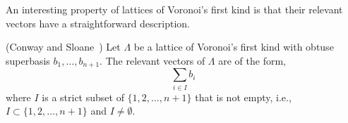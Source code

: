 \documentclass[final,leqno]{siamltex}
\begin{document}
An interesting property of lattices of Voronoi's first kind is that their relevant vectors have a straightforward description.

\begin{theorem} \label{thm:revvecssuperbase} (Conway and Sloane~\cite[Theorem~3]{ConwaySloane1992_voronoi_lattice_3d_obtuse_superbases}) Let $\Lambda$ be a lattice of Voronoi's first kind with obtuse superbasis $b_1,\dots,b_{n+1}$.  The relevant vectors of $\Lambda$ are of the form,
\[
\sum_{i \in I} b_i
\]
where $I$ is a strict subset of $\{1, 2, \dots, n+1\}$ that is not empty, i.e., $I \subset \{1, 2, \dots, n+1\}$ and $I \neq \emptyset$.
\end{theorem}  
 
\end{document}
